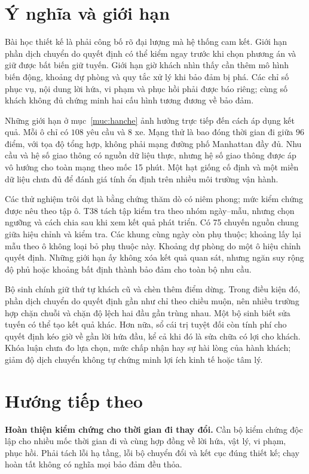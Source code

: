 \section{Ý nghĩa và giới hạn}

Bài học thiết kế là phải công bố rõ đại lượng mà hệ thống cam kết. Giới hạn phần dịch
chuyển do quyết định có thể kiểm ngay trước khi chọn phương án và giữ được bất biến
giữ tuyến. Giới hạn giờ khách nhìn thấy cần thêm mô hình biến động, khoảng dự phòng và
quy tắc xử lý khi bảo đảm bị phá. Các chỉ số phục vụ, nội dung lời hứa, vi phạm và phục
hồi phải được báo riêng; cùng số khách không đủ chứng minh hai cấu hình tương đương
về bảo đảm.

Những giới hạn ở mục~\ref{muc:hanche} ảnh hưởng trực tiếp đến cách áp dụng kết quả.
Mỗi ô chỉ có $108$ yêu cầu và $8$ xe. Mạng thử là bao đóng thời gian đi giữa $96$
điểm, với tọa độ tổng hợp, không phải mạng đường phố Manhattan đầy đủ. Nhu cầu và hệ số
giao thông có nguồn dữ liệu thực, nhưng hệ số giao thông được áp vô hướng cho toàn mạng
theo mốc 15 phút. Một hạt giống cố định và một miền dữ liệu chưa đủ để đánh giá tính
ổn định trên nhiều môi trường vận hành.

Các thử nghiệm trôi dạt là bằng chứng thăm dò có niêm phong; mức kiểm chứng được nêu
theo tập ô. T38 tách tập kiểm tra theo nhóm ngày--mẫu, nhưng chọn ngưỡng và cách chia
sau khi xem kết quả phát triển. Có 75 chuyến nguồn chung giữa hiệu chỉnh và kiểm tra.
Các khung cùng ngày còn phụ thuộc; khoảng lấy lại mẫu theo ô không loại bỏ phụ thuộc
này. Khoảng dự phòng do một ô hiệu chỉnh quyết định. Những giới hạn ấy không xóa kết quả
quan sát, nhưng ngăn suy rộng độ phủ hoặc khoảng bất định thành bảo đảm cho toàn bộ nhu cầu.

Bộ sinh chính giữ thứ tự khách cũ và chèn thêm điểm dừng. Trong điều kiện đó, phần
dịch chuyển do quyết định gần như chỉ theo chiều muộn, nên nhiều trường hợp chặn
chuỗi và chặn độ lệch hai đầu gần trùng nhau. Một bộ sinh biết sửa tuyến có thể tạo
kết quả khác. Hơn nữa, sổ cái trị tuyệt đối còn tính phí cho quyết định kéo giờ về
gần lời hứa đầu, kể cả khi đó là sửa chữa có lợi cho khách. Khóa luận chưa đo lựa
chọn, mức chấp nhận hay sự hài lòng của hành khách; giảm độ dịch chuyển không tự
chứng minh lợi ích kinh tế hoặc tâm lý.

\section{Hướng tiếp theo}

\textbf{Hoàn thiện kiểm chứng cho thời gian đi thay đổi.} Cần bộ kiểm chứng độc lập
cho nhiều mốc thời gian đi và cùng hợp đồng về lời hứa, vật lý, vi phạm, phục hồi.
Phải tách lỗi hạ tầng, lỗi bộ chuyển đổi và kết cục đúng thiết kế; chạy hoàn tất
không có nghĩa mọi bảo đảm đều thỏa.


